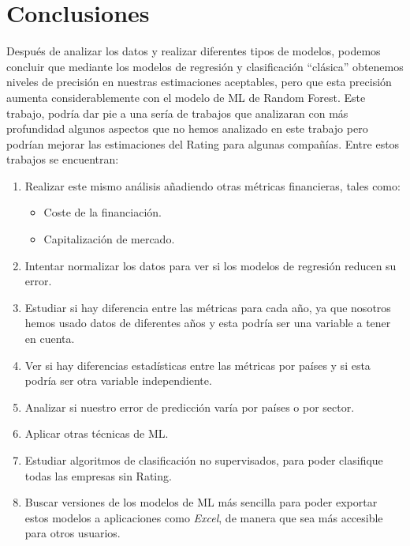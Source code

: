 \documentclass{article}
\begin{document}
\section{Conclusiones}\label{sec:conclusiones}

Después de analizar los datos y realizar diferentes tipos de modelos, podemos concluir que mediante los modelos de regresión y clasificación ``clásica'' obtenemos niveles de precisión en nuestras estimaciones aceptables, pero que esta precisión aumenta considerablemente con el modelo de ML de Random Forest. Este trabajo, podría dar pie a una sería de trabajos que analizaran con más profundidad algunos aspectos que no hemos analizado en este trabajo pero podrían mejorar las estimaciones del Rating para algunas compañías. Entre estos trabajos se encuentran:
\begin{enumerate}
    \item Realizar este mismo análisis añadiendo otras métricas financieras, tales como:
    \begin{itemize}
        \item Coste de la financiación.
        \item Capitalización de mercado.
    \end{itemize}
    \item Intentar normalizar los datos para ver si los modelos de regresión reducen su error.
    \item Estudiar si hay diferencia entre las métricas para cada año, ya que nosotros hemos usado datos de diferentes años y esta podría ser una variable a tener en cuenta.
    \item Ver si hay diferencias estadísticas entre las métricas por países y si esta podría ser otra variable independiente.
    \item Analizar si nuestro error de predicción varía por países o por sector.
    \item Aplicar otras técnicas de ML.
    \item Estudiar algoritmos de clasificación no supervisados, para poder clasifique todas las empresas sin Rating.
    \item Buscar versiones de los modelos de ML más sencilla para poder exportar estos modelos a aplicaciones como \textit{Excel}, de manera que sea más accesible para otros usuarios.    
\end{enumerate}


\printbibliography %
\end{document}
